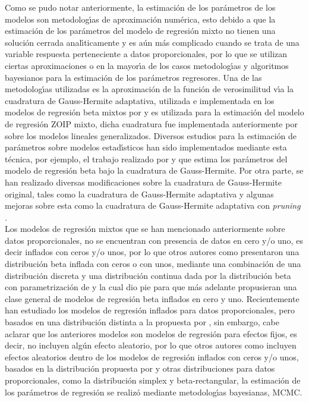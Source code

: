 Como se pudo notar anteriormente, la estimaci\'{o}n de los par\'{a}metros de los modelos son metodolog\'{\i}as de aproximaci\'{o}n num\'{e}rica, esto debido a que la estimaci\'{o}n de los pa\-r\'{a}\-me\-tros del modelo de regresi\'{o}n mixto no tienen una soluci\'{o}n cerrada anal\'{\i}ticamente y es a\'{u}n m\'{a}s complicado cuando se trata de una variable respuesta perteneciente a datos proporcionales, por lo que se utilizan ciertas aproximaciones o en la mayor\'{\i}a de los casos metodolog\'{\i}as y algoritmos bayesianos para la estimaci\'{o}n de los par\'{a}metros regresores. Una de las metodolog\'{\i}as utilizadas es la aproximaci\'{o}n de la funci\'{o}n de verosimilitud v\'{\i}a la cuadratura de Gauss-Hermite adaptativa, utilizada e implementada en los modelos de regresi\'{o}n beta mixtos por \cite{Usuga1} y es utilizada para la estimaci\'{o}n del modelo de regresi\'{o}n ZOIP mixto, dicha cuadratura fue implementada anteriormente por \cite{Fahrmeir1} sobre los modelos lineales generalizados. Diversos estudios para la estimaci\'{o}n de par\'{a}metros sobre modelos estad\'{\i}sticos han sido implementados mediante esta t\'{e}cnica, por ejemplo, el trabajo realizado por \cite{Liu1} y \cite{Smithson1} que estima los par\'{a}metros del modelo de regresi\'{o}n beta bajo la cuadratura de Gauss-Hermite. Por otra parte, se han realizado diversas modificaciones sobre la cuadratura de Gauss-Hermite original, tales como la cuadratura de Gauss-Hermite adaptativa y algunas mejoras sobre esta como la cuadratura de Gauss-Hermite adaptativa con \textit{pruning} \citep{Hernandez1}.\\

Los modelos de regresi\'{o}n mixtos que se han mencionado anteriormente sobre datos proporcionales, no se encuentran con presencia de datos en cero y/o uno, es decir inflados con ceros y/o unos, por lo que otros autores como \cite{Ospina2} presentaron una distribuci\'{o}n beta inflada con ceros o con unos, mediante una combinaci\'{o}n de una distribuci\'{o}n discreta y una distribuci\'{o}n continua dada por la distribuci\'{o}n beta con parametrizaci\'{o}n de \cite{Ferrari2} y la cual dio pie para que m\'{a}s adelante \cite{Ospina1} propusieran una clase general de modelos de regresi\'{o}n beta inflados en cero y uno. Recientemente \cite{Kosmidis1} han estudiado los modelos de regresi\'{o}n inflados para datos proporcionales, pero basados en una distribuci\'{o}n distinta a la propuesta por \cite{Ospina1}, sin embargo, cabe aclarar que los anteriores modelos son modelos de regresi\'{o}n para efectos fijos, es decir, no incluyen alg\'{u}n efecto aleatorio, por lo que otros autores como \cite{Galvis1} incluyen efectos aleatorios dentro de los modelos de regresi\'{o}n inflados con ceros y/o unos, basados en la distribuci\'{o}n propuesta por \cite{Ospina2}y otras distribuciones para datos proporcionales, como la distribuci\'{o}n simplex y beta-rectangular, la estimaci\'{o}n de los par\'{a}metros de regresi\'{o}n se realiz\'{o} mediante metodolog\'{\i}as bayesianas, MCMC.\\

